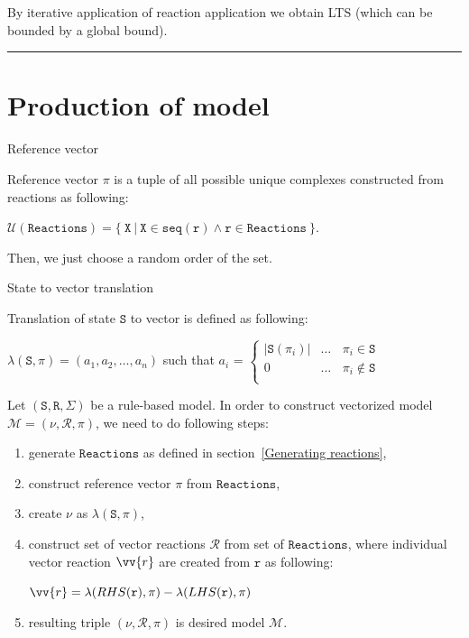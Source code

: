 \documentclass[12pt]{fithesis2}
\begin{document}
By iterative application of reaction application we obtain LTS (which can be bounded by a global bound).

\noindent\rule{\textwidth}{1pt}

\section{Production of model}

\begin{definition}{Reference vector}

Reference vector $\pi$ is a tuple of all possible unique complexes constructed from reactions as following:

\begin{center}
$\mathcal{U}(\mathtt{Reactions}) = \{~ \mathtt{X} ~|~ \mathtt{X} \in \mathtt{seq}(\mathtt{r}) \wedge \mathtt{r} \in \mathtt{Reactions} ~\} $.
\end{center}

Then, we just choose a random order of the set.
\end{definition}

\begin{definition}{State to vector translation}

Translation of state $\mathtt{S}$ to vector is defined as following:
\begin{center}
$\lambda(\mathtt{S}, \pi) = (a_1, a_2, \ldots, a_n)$ such that 
$a_i$ =
	$\begin{cases}
	|\mathtt{S}(\pi_i)| & \ldots~~~~ \pi_i \in \mathtt{S}\\
	0 & \ldots~~~~ \pi_i \not\in \mathtt{S}\\
	\end{cases}
	$
\end{center}
\end{definition}

Let $(\mathtt{S}, \mathtt{R}, \Sigma)$ be a rule-based model. In order to construct vectorized model $\mathcal{M} = (\nu, \mathcal{R}, \pi)$, we need to do following steps:

\begin{enumerate}
\item generate $\mathtt{Reactions}$ as defined in section~\ref{Generating reactions},
\item construct reference vector $\pi$ from $\mathtt{Reactions}$,
\item create $\nu$ as $\lambda(\mathtt{S}, \pi)$,
\item construct set of vector reactions $\mathcal{R}$ from set of $\mathtt{Reactions}$, where individual vector reaction $\vv{r}$ are created from $\mathtt{r}$ as following:

\begin{center}
$\vv{r} = \lambda(RHS(\mathtt{r}), \pi) - \lambda(LHS(\mathtt{r}), \pi)$
\end{center}

\item resulting triple $(\nu, \mathcal{R}, \pi)$ is desired model $\mathcal{M}$.
\end{enumerate}
\end{document}
